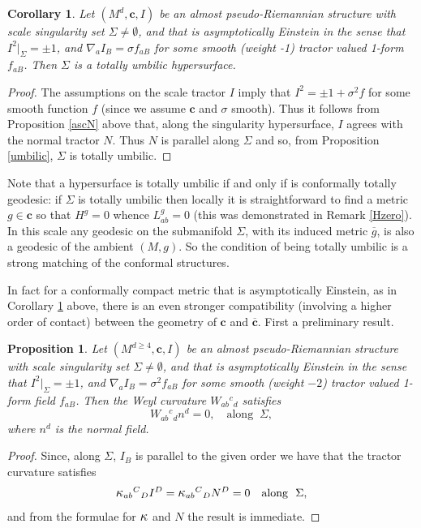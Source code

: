 \documentclass[a4paper,12pt]{amsart}
\newcommand{\kappal}{\mbox{\large{$\kappa$}}}
\newcommand{\og}{\overline{g}}
\newcommand{\cc}{\boldsymbol{c}}
\newcommand{\si}{\sigma}
\newtheorem{proposition}[theorem]{Proposition}
\newtheorem{corollary}[theorem]{Corollary}
\theoremstyle{remark}
\begin{document}
\begin{corollary}\label{aEu}
Let $(M^d,\cc,I)$ be an almost pseudo-Riemannian structure with scale
singularity set $\Sigma\neq \emptyset$, and that is asymptotically
Einstein in the sense that $I^2|_\Sigma= \pm 1$, and $\nabla_a I_B = \si f_{aB}$ for some smooth (weight -1) tractor valued 1-form $f_{aB}$.  Then $\Sigma $ is a totally umbilic hypersurface.
\end{corollary}
\begin{proof}
The assumptions on the scale tractor $I$ imply that $I^2=\pm 1 + \si^2 f$ for some smooth function $f$ (since we assume $\cc$ and $\si$ smooth).
Thus it follows from Proposition \ref{ascN} above that, along the singularity hypersurface, $I$ agrees with the normal tractor $N$.   Thus $N$ is parallel along $\Sigma$ and so, from Proposition \ref{umbilic}, $\Sigma$ is totally umbilic.
\end{proof}

Note that a hypersurface is totally umbilic if and only if is conformally
totally geodesic: if $\Sigma$ is totally umbilic then locally it is
straightforward to find a metric $g\in \cc$ so that $H^g =0$ whence
$L^g_{ab}=0$ (this was demonstrated in Remark \ref{Hzero}). In this scale any geodesic on the submanifold $\Sigma$, with its
induced metric $\og$, is also a geodesic of the ambient $(M,g)$.  So
the condition of being totally umbilic is a strong matching of the
conformal structures.

In fact for a conformally compact metric that is asymptotically
Einstein, as in Corollary \ref{aEu} above, there is an even stronger
compatibility (involving a higher order of contact) between the geometry of $\cc$ and $\overline{\cc}$.
First a preliminary result. 
\begin{proposition}\label{lastnail}
Let $(M^{d\geq 4},\cc,I)$ be an almost pseudo-Riemannian structure with scale singularity set $\Sigma\neq \emptyset$, and that is asymptotically
Einstein in the sense that $I^2|_\Sigma= \pm 1$, and $\nabla_a I_B = \si^2 f_{aB}$ for some smooth (weight $-2$) tractor valued 1-form  field $f_{aB}$. Then the Weyl curvature $W_{ab}{}^c{}_d$ satisfies 
$$
W_{ab}{}^c{}_dn^d =0, \quad \mbox{along }~\Sigma ,
$$
where $n^d$ is the normal field.
\end{proposition}
\begin{proof}
Since, along $\Sigma$, $I_B$ is parallel to the given order we have that the tractor curvature satisfies 
$$
\kappal_{ab}{}^C{}_D I^D =\kappal_{ab}{}^C{}_D N^D = 0  \quad \mbox{along }~\Sigma ,
$$
and from the formulae for $\kappal$ and $N$ the result is immediate.
\end{proof}
\end{document}
